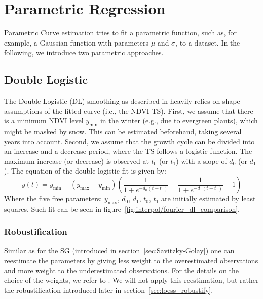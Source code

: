 
\section{Parametric Regression} 
	\label{sec:itpl_parametric}
	Parametric Curve estimation tries to fit a parametric function, such as, for example, a Gaussian function with parameters $\mu$ and $\sigma$, to a dataset. In the following, we introduce two parametric approaches.

	\subsection{Double Logistic}
		\label{sec:double_logistic}
		The Double Logistic (DL) smoothing as described in \cite{beckImprovedMonitoringVegetation2006} heavily relies on shape assumptions of the fitted curve (i.e., the NDVI {TS}). First, we assume that there  is a minimum NDVI level $y_{\min}$ in the winter (e.g., due to evergreen plants), which might be masked by snow. This can be estimated beforehand, taking several years into account. Second, we assume that the growth cycle can be divided into an increase and a decrease period, where the {TS} follows a logistic function. The maximum increase (or decrease) is observed at $t_0$ (or $t_1$) with a slope of $d_0$ (or $d_1$). The equation of the double-logistic fit is given by:
		\begin{equation*}
			y(t) = y_{\min} + \left(y_{\max}-y_{\min}\right)\left(\frac{1}{1+e^{-d_0(t-t_0)}}+\frac{1}{1+e^{-d_1(t-t_1)}}-1\right)
		\end{equation*}
		Where the five free parameters: $y_{\max}$, $d_0$, $d_1$, $t_0$, $t_1$ are initially estimated by least squares. Such fit can be seen in figure~\ref{fig:interpol/fourier_dl_comparison}.

		\subsubsection*{Robustification}
		Similar as for the SG (introduced in section~\ref{sec:Savitzky-Golay}) one can reestimate the parameters by giving less weight to the overestimated observations and more weight to the underestimated observations. For the details on the choice of the weights, we refer to \cite{beckImprovedMonitoringVegetation2006}. We will not apply this reestimation, but rather the robustification introduced later in section~\ref{sec:loess_robustify}.

